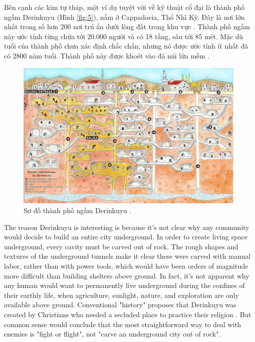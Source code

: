 \documentclass[10pt,twocolumn,letterpaper]{article}
\begin{document}
Bên cạnh các kim tự tháp, một ví dụ tuyệt vời về kỹ thuật cổ đại là thành phố ngầm Derinkuyu (Hình \ref{fig:5}), nằm ở Cappadocia, Thổ Nhĩ Kỳ. Đây là nơi lớn nhất trong số hơn 200 nơi trú ẩn dưới lòng đất trong khu vực \cite{54}. Thành phố ngầm này ước tính từng chứa tới 20.000 người và có 18 tầng, sâu tới 85 mét. Mặc dù tuổi của thành phố chưa xác định chắc chắn, nhưng nó được ước tính ít nhất đã có 2800 năm tuổi. Thành phố này được khoét vào đá núi lửa mềm \cite{52, 53}.

\begin{figure}[b]
\begin{center}
   \includegraphics[width=1\linewidth]{derinkuyu.jpeg}
\end{center}
   \caption{Sơ đồ thành phố ngầm Derinkuyu \cite{56}.}
\label{fig:5}
\label{fig:onecol}
\end{figure}
The reason Derinkuyu is interesting is because it's not clear why any community would decide to build an entire city underground. In order to create living space underground, every cavity must be carved out of rock. The rough shapes and textures of the underground tunnels make it clear these were carved with manual labor, rather than with power tools, which would have been orders of magnitude more difficult than building shelters above ground. In fact, it's not apparent why any human would want to permanently live underground during the confines of their earthly life, when agriculture, sunlight, nature, and exploration are only available above ground. Conventional "history" proposes that Derinkuyu was created by Christians who needed a secluded place to practice their religion \cite{53}. But common sense would conclude that the most straightforward way to deal with enemies is "fight or flight", not "carve an underground city out of rock".
\end{document}

